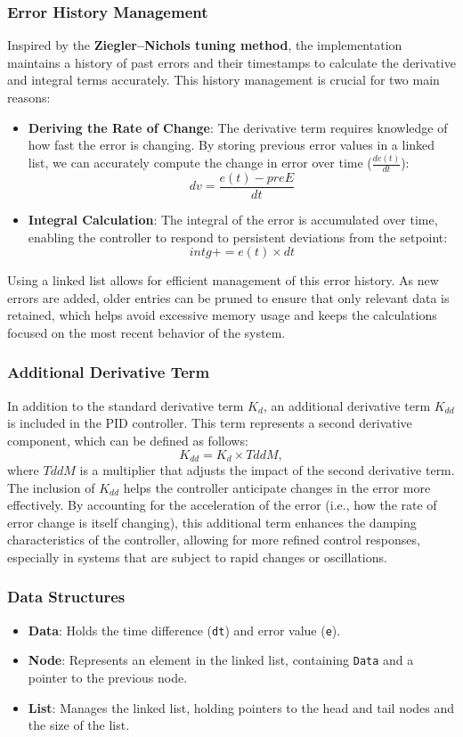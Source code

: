 \documentclass[a4paper,12pt]{article}
\begin{document}
\subsubsection{Error History Management}
Inspired by the \textbf{Ziegler–Nichols tuning method}, the implementation maintains a history of past errors and their timestamps to calculate the derivative and integral terms accurately. This history management is crucial for two main reasons:
\begin{itemize}
\item \textbf{Deriving the Rate of Change}: The derivative term requires knowledge of how fast the error is changing. By storing previous error values in a linked list, we can accurately compute the change in error over time ($\frac{de(t)}{dt}$):
$$
  dv = \frac{e(t) - preE}{dt}
$$
\item \textbf{Integral Calculation}: The integral of the error is accumulated over time, enabling the controller to respond to persistent deviations from the setpoint:
$$
  intg += e(t) \times dt
$$
\end{itemize}
Using a linked list allows for efficient management of this error history. As new errors are added, older entries can be pruned to ensure that only relevant data is retained, which helps avoid excessive memory usage and keeps the calculations focused on the most recent behavior of the system.
\subsubsection{Additional Derivative Term}
In addition to the standard derivative term $K_d$, an additional derivative term $K_{dd}$ is included in the PID controller. This term represents a second derivative component, which can be defined as follows:
$$
K_{dd} = K_d \times TddM,
$$
where $TddM$ is a multiplier that adjusts the impact of the second derivative term. \\
The inclusion of $K_{dd}$ helps the controller anticipate changes in the error more effectively. By accounting for the acceleration of the error (i.e., how the rate of error change is itself changing), this additional term enhances the damping characteristics of the controller, allowing for more refined control responses, especially in systems that are subject to rapid changes or oscillations.
\subsubsection{Data Structures}
\begin{itemize}
\item \textbf{Data}: Holds the time difference (\texttt{dt}) and error value (\texttt{e}).
\item \textbf{Node}: Represents an element in the linked list, containing \texttt{Data} and a pointer to the previous node.
\item \textbf{List}: Manages the linked list, holding pointers to the head and tail nodes and the size of the list.
\end{itemize}
\end{document}
